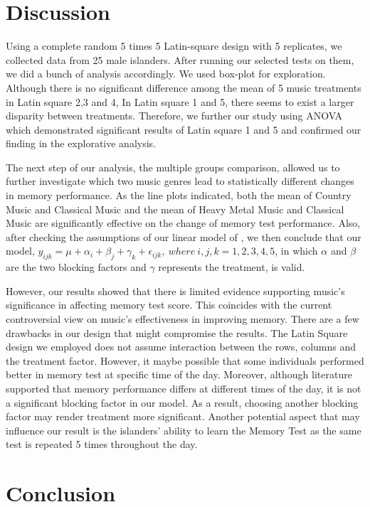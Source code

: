 \documentclass[]{article}
\begin{document}
\section{Discussion}\label{discussion}

Using a complete random 5 times 5 Latin-square design with 5 replicates,
we collected data from 25 male islanders. After running our selected
tests on them, we did a bunch of analysis accordingly. We used box-plot
for exploration. Although there is no significant difference among the
mean of 5 music treatments in Latin square 2,3 and 4, In Latin square 1
and 5, there seems to exist a larger disparity between treatments.
Therefore, we further our study using ANOVA which demonstrated
significant results of Latin square 1 and 5 and confirmed our finding in
the explorative analysis.

The next step of our analysis, the multiple groups comparison, allowed
us to further investigate which two music genres lead to statistically
different changes in memory performance. As the line plots indicated,
both the mean of Country Music and Classical Music and the mean of Heavy
Metal Music and Classical Music are significantly effective on the
change of memory test performance. Also, after checking the assumptions
of our linear model of , we then conclude that our model,
\(y_{ijk} = \mu + \alpha_{i} + \beta_{j} + \gamma_{k} + \epsilon_{ijk},\ where\  i, j, k = 1, 2, 3, 4, 5\),
in which \(\alpha\) and \(\beta\) are the two blocking factors and
\(\gamma\) represents the treatment, is valid.

However, our results showed that there is limited evidence supporting
music's significance in affecting memory test score. This coincides with
the current controversial view on music's effectiveness in improving
memory. There are a few drawbacks in our design that might compromise
the results. The Latin Square design we employed does not assume
interaction between the rows, columns and the treatment factor. However,
it maybe possible that some individuals performed better in memory test
at specific time of the day. Moreover, although literature supported
that memory performance differs at different times of the day, it is not
a significant blocking factor in our model. As a result, choosing
another blocking factor may render treatment more significant. Another
potential aspect that may influence our result is the islanders' ability
to learn the Memory Test as the same test is repeated 5 times throughout
the day.

\section{Conclusion}\label{conclusion}
\end{document}
